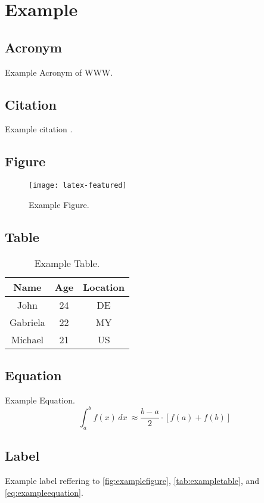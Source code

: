\chapter{Example}

\section{Acronym}
Example Acronym of \ac{WWW}.

\section{Citation}

Example citation \cite{shannon1949communication}.

\section{Figure}

\begin{figure}
  \centering
  \texttt{[image: latex-featured]}
  \caption{Example Figure.}
  \label{fig:examplefigure}
\end{figure}

\section{Table}

\begin{table}
	\centering
	\caption{Example Table.}
	\label{tab:exampletable}
	\begin{tabular}{ccc}
		\toprule
		Name & Age & Location \\ \midrule
    John & 24 & DE \\
    Gabriela & 22 & MY \\
    Michael & 21 & US \\ \bottomrule
	\end{tabular}
\end{table}

\section{Equation}

Example Equation.
\begin{equation}
	\int_{a}^{b} f(x) \, dx\ \approx \frac{b - a}{2} \cdot [f(a) + f(b)]
	\label{eq:exampleequation}
\end{equation}

\section{Label}

Example label reffering to \autoref{fig:examplefigure}, \autoref{tab:exampletable}, and \autoref{eq:exampleequation}.

